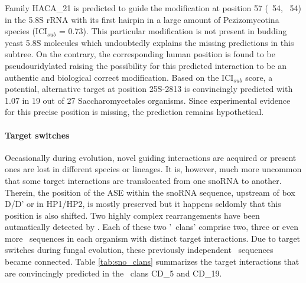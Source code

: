 Family HACA\_21 is
predicted to guide the modification at position 57 (\ncr\ 54, \sce\ 54) in the
5.8S rRNA with its first hairpin in a large amount of Pezizomycotina
species (ICI$_{sub}$ = 0.73). This particular modification is not present in budding yeast
5.8S molecules which undoubtedly explains the missing predictions in
this subtree. On the contrary, the corresponding human position is found to
be pseudouridylated raising the possibility for this predicted
interaction to be an authentic and biological correct modification.
Based on the ICI$_{sub}$ score, a potential, alternative target at
position 25S-2813 is convincingly predicted with 1.07 in 19 out of
27 Saccharomycetales organisms. Since experimental evidence for this
precise position is missing, the prediction remains hypothetical.

\paragraph{\textbf{Target switches}}
Occasionally during evolution, novel guiding interactions are acquired
or present ones are lost in different species or lineages. It is,
however, much more uncommon that some target interactions are
translocated from one snoRNA to another. Therein, the position of the ASE
within the snoRNA sequence, upstream of box D/D’ or in HP1/HP2, is mostly
preserved but it happens seldomly that this position is also
shifted. Two highly complex rearrangements have been autmatically
detected by \snostrip. Each of these two '\sno\ clans' comprise two,
three or even more \sno\ sequences in each organism with distinct
target interactions. Due to target switches during fungal evolution,
these previously independent \sno\ sequences became connected. Table
\ref{tab:sno_clans} summarizes the target interactions that are convincingly predicted in the \sno\ clans CD\_5 and CD\_19.
